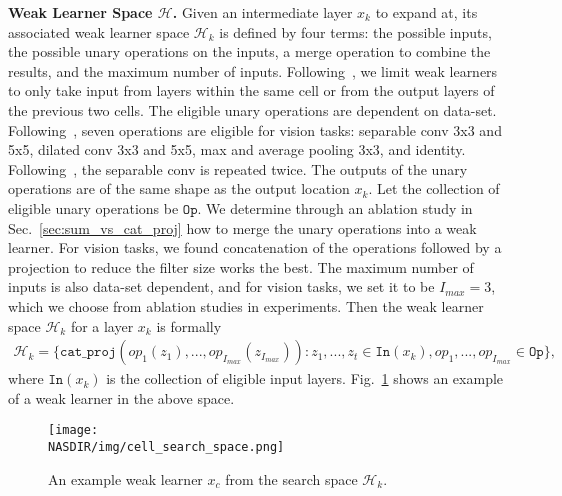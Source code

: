 \textbf{Weak Learner Space $\mathcal{H}$.}
Given an intermediate layer $x_{k}$ to expand at, its associated weak learner space $\mathcal{H}_{k}$ is defined by four terms: the possible inputs, the
possible unary operations on the inputs, a merge operation to combine the results, and the maximum number of inputs. 
Following~\citep{NASCell,Real2018RegularizedEF,Liu2018DARTSDA}, we limit weak learners to only take input from layers within the same cell or from the output layers of the previous 
two cells. 
The eligible unary operations are dependent on data-set. Following~\citep{Liu2018DARTSDA}, seven operations are eligible for vision tasks:  
separable conv 3x3 and 5x5, dilated conv 3x3 and 5x5, max and average pooling 3x3, and identity. Following~\citep{NASCell,Real2018RegularizedEF}, the separable conv is 
repeated twice. The outputs of the unary operations are of the same shape 
as the output location $x_k$. 
Let the collection of eligible unary operations be $\texttt{Op}$.
We determine through an ablation study in Sec.~\ref{sec:sum_vs_cat_proj} how to merge the unary operations into a weak learner. For vision tasks, we found 
concatenation of the operations followed by a projection to reduce the filter size works the best. 
The maximum number of inputs is also data-set dependent, and for vision tasks, we set it to be $I_{max} = 3$, which we choose from ablation studies in experiments.
Then the weak learner space $\mathcal{H}_{k}$ for a layer $x_{k}$ is formally 
\begin{align}
\mathcal{H}_{k} = \{ \texttt{cat\_proj}( op_1(z_1), ..., op_{I_{max}}(z_{I_{max}})) : z_1, ..., z_t \in \texttt{In}(x_{k}), op_1, ..., op_{I_{max}} \in \texttt{Op}  \},
\end{align}
where $\texttt{In}(x_{k})$ is the collection of eligible input layers.
Fig.~\ref{fig:cell_search_space} shows an example of a weak learner in the above space. 
\begin{figure}
\centering
\texttt{[image: \\NASDIR/img/cell\_search\_space.png]}
\caption{An example weak learner $x_c$ from the search space $\mathcal{H}_k$.}
\label{fig:cell_search_space}
\end{figure}


